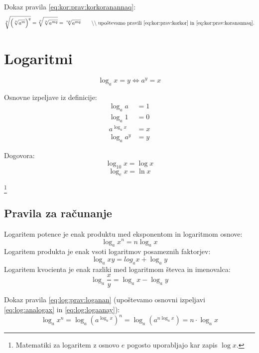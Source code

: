 \documentclass[a4paper,oneside,12pt,fleqn]{article}
\newcommand\krat\cdot
\newcommand{\comment}[1]{\ensuremath{\qquad\backslash\backslash\;}\textnormal{#1}}
\renewcommand\iff\Leftrightarrow
\numberwithin{equation}{section}
\begin{document}
Dokaz pravila \ref{eq:kor:prav:korkoranannaq}:
\[  \sqrt[p]{\left( \sqrt[n]{a^m} \right)^q} = \sqrt[p]{\sqrt[n]{a^{mq}}} =
\sqrt[np]{a^{mq}} \comment{upoštevamo pravili \eqref{eq:kor:prav:korkor} in
\eqref{eq:kor:prav:koranannaq}.} \]

\section{Logaritmi}
\label{sec:log}
\begin{equation}
  \label{eq:log:def}
  \log_a\! x = y \iff a^y = x 
\end{equation}

Osnovne izpeljave iz definicije:
\begin{align}
  \log_a\! a &= 1 \label{eq:log:logaaje1} \\
  \log_a\! 1 &= 0 \label{eq:log:log1je0} \\
  a^{\log_a\! x} &= x \label{eq:log:analogax} \\
  \log_a\! a^y &= y \label{eq:log:logaanay}
\end{align}

Dogovora: \\
\[ \log_{10}\!x = \log x \]
\[ \log_{e}\!x = \ln x \] 

\vspace{-24pt}

\hspace{95pt}
\footnote{Matematiki za logaritem z osnovo $e$ pogosto uporabljajo
kar zapis $\log x$.}

\subsection{Pravila za računanje}
\label{sec:eq:log:prav}
Logaritem potence je enak produktu med eksponentom in logaritmom osnove:
\begin{equation}
  \log_a\! x^n = n\log_a\! x \label{eq:log:prav:loganan}
\end{equation}
Logaritem produkta je enak vsoti logaritmov posameznih faktorjev:
\begin{equation}
  \log_a\! xy = log_a\!x+ \log_a\!y \label{eq:log:prav:logprod}
\end{equation}
Logaritem kvocienta je enak razliki med logaritmom števca in imenovalca:
\begin{equation}
  \log_a\!\frac{x}{y} = \log_a\!x-\log_a\!y \label{eq:log:prav:logkvoc}
\end{equation}

Dokaz pravila \ref{eq:log:prav:loganan} (upoštevamo osnovni izpeljavi \eqref{eq:log:analogax} in
\eqref{eq:log:logaanay}):
\[ \log_a\!x^n = \log_a\!\left( a^{\log_a\!x} \right)^n = \log_a\!\left( a^{n\log_a\!x}
\right) = n \krat \log_a\!x  \]
\end{document}
